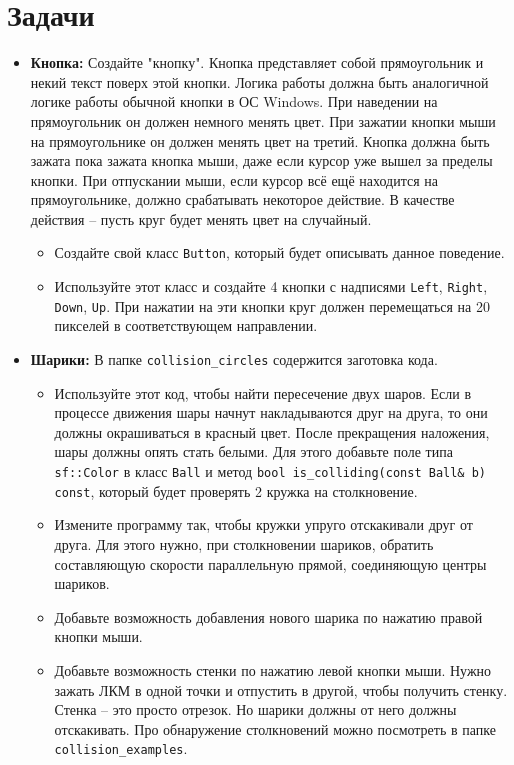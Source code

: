 \documentclass{article}
\begin{document}
\newpage
\section*{Задачи}
\begin{itemize}
\item \textbf{Кнопка:} Создайте "кнопку". Кнопка представляет собой прямоугольник и некий текст поверх этой кнопки. Логика работы должна быть аналогичной логике работы обычной кнопки в ОС Windows. При наведении на прямоугольник он должен немного менять цвет. При зажатии кнопки мыши на прямоугольнике он должен менять цвет на третий. Кнопка должна быть зажата пока зажата кнопка мыши, даже если курсор уже вышел за пределы кнопки. При отпускании мыши, если курсор всё ещё находится на прямоугольнике, должно срабатывать некоторое действие. В качестве действия -- пусть круг будет менять цвет на случайный.

\begin{itemize}
\item Создайте свой класс \texttt{Button}, который будет описывать данное поведение.
\item Используйте этот класс и создайте 4 кнопки с надписями \texttt{Left}, \texttt{Right}, \texttt{Down}, \texttt{Up}. При нажатии на эти кнопки круг должен перемещаться на 20 пикселей в соответствующем направлении. 
\end{itemize}

\item \textbf{Шарики:} В папке \texttt{collision\_circles} содержится заготовка кода. 
\begin{itemize}
\item Используйте этот код, чтобы найти пересечение двух шаров. Если в процессе движения шары начнут накладываются друг на друга, то они должны окрашиваться в красный цвет. После прекращения наложения, шары должны опять стать белыми. Для этого добавьте поле типа \texttt{sf::Color} в класс \texttt{Ball} и метод \texttt{bool is\_colliding(const Ball\& b) const}, который будет проверять 2 кружка на столкновение.
\item Измените программу так, чтобы кружки упруго отскакивали друг от друга. Для этого нужно, при столкновении шариков, обратить составляющую скорости параллельную прямой, соединяющую центры шариков.
\item Добавьте возможность добавления нового шарика по нажатию правой кнопки мыши.
\item Добавьте возможность стенки по нажатию левой кнопки мыши. Нужно зажать ЛКМ в одной точки и отпустить в другой, чтобы получить стенку. Стенка -- это просто отрезок. Но шарики должны от него должны отскакивать. Про обнаружение столкновений можно посмотреть в папке \texttt{collision\_examples}.
\end{itemize}




\end{itemize}
\end{document}
